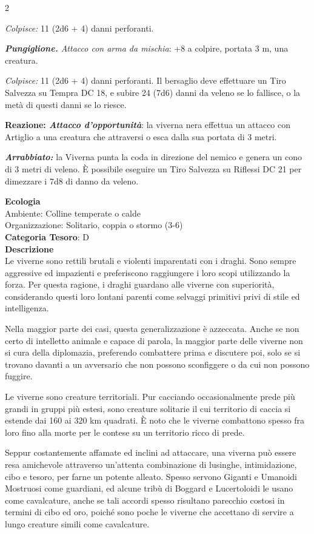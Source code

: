 \begin{multicols}{2}
{\emph{Colpisce:} 11 (2d6 + 4) danni perforanti.

\emph{\textbf{Pungiglione.} Attacco con arma da mischia}: +8 a colpire, portata 3 m, una creatura.

\emph{Colpisce:} 11 (2d6 + 4) danni perforanti. Il bersaglio deve effettuare un Tiro Salvezza su Tempra DC 18, e subire 24 (7d6) danni da veleno se lo fallisce, o la metà di questi danni se lo riesce.

\textbf{Reazione: \emph{Attacco d'opportunità}}: la viverna nera effettua un attacco con Artiglio a una creatura che attraversi o esca dalla sua portata di 3 metri.

\emph{\textbf{Arrabbiato:}} la Viverna punta la coda in direzione del nemico e genera un cono di 3 metri di veleno. È possibile eseguire un Tiro Salvezza su Riflessi DC 21 per dimezzare i 7d8 di danno da veleno.

\textbf{Ecologia}\\
Ambiente: Colline temperate o calde\\
Organizzazione: Solitario, coppia o stormo (3-6)\\
\textbf{Categoria Tesoro}: D\\
\textbf{Descrizione}\\
Le viverne sono rettili brutali e violenti imparentati con i draghi. Sono sempre aggressive ed impazienti e preferiscono raggiungere i loro scopi utilizzando la forza. Per questa ragione, i draghi guardano alle viverne con superiorità, considerando questi loro lontani parenti come selvaggi primitivi privi di stile ed intelligenza.

Nella maggior parte dei casi, questa generalizzazione è azzeccata. Anche se non certo di intelletto animale e capace di parola, la maggior parte delle viverne non si cura della diplomazia, preferendo combattere prima e discutere poi, solo se si trovano davanti a un avversario che non possono sconfiggere o da cui non possono fuggire.

Le viverne sono creature territoriali. Pur cacciando occasionalmente prede più grandi in gruppi più estesi, sono creature solitarie il cui territorio di caccia si estende dai 160 ai 320 km quadrati. È noto che le viverne combattono spesso fra loro fino alla morte per le contese su un territorio ricco di prede.

Seppur costantemente affamate ed inclini ad attaccare, una viverna può essere resa amichevole attraverso un'attenta combinazione di lusinghe, intimidazione, cibo e tesoro, per farne un potente alleato. Spesso servono Giganti e Umanoidi Mostruosi come guardiani, ed alcune tribù di Boggard e Lucertoloidi le usano come cavalcature, anche se tali accordi spesso risultano parecchio costosi in termini di cibo ed oro, poiché sono poche le viverne che accettano di servire a lungo creature simili come cavalcature.

}
\end{multicols}
